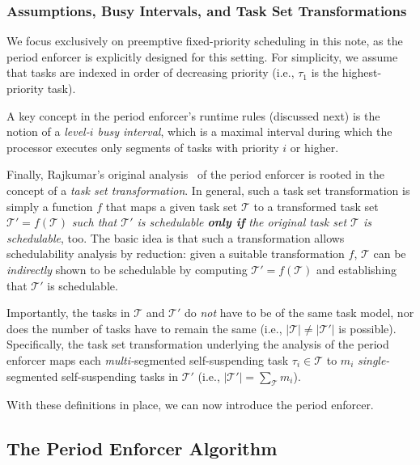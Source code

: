 \subsubsection{Assumptions, Busy Intervals, and Task Set Transformations}
\label{sec:misc-defs}

We focus exclusively on preemptive fixed-priority scheduling in this note, as the period enforcer is explicitly designed for this setting. For simplicity, we assume that tasks are indexed in order of decreasing priority (i.e., $\tau_1$ is the highest-priority task). 

A key concept in the period enforcer's runtime rules (discussed next) is the notion of a \emph{level-$i$ busy interval}, which is a maximal interval during which  the processor executes only segments of tasks with priority $i$ or higher.

\newcommand{\tset}[0]{\mathcal{T}}

Finally, Rajkumar's original analysis~\cite{Raj:suspension1991} of the period enforcer is rooted in the concept of a \emph{task set transformation}. In general, such a task set transformation is simply a function $f$ that maps a given task set $\tset$ to a transformed task set $\tset' = f(\tset)$ \emph{such that $\tset'$ is schedulable \textbf{only if} the original task set $\tset$ is schedulable}, too. The basic idea is that such a transformation allows schedulability analysis by reduction: given a suitable transformation $f$, $\tset$ can be  \emph{indirectly} shown to be schedulable by computing $\tset' = f(\tset)$ and establishing that $\tset'$ is schedulable.



Importantly, the tasks in $\tset$ and $\tset'$ do \emph{not} have to be of the same task model, nor does the number of tasks have to remain the same (i.e.,  $|\tset| \neq |\tset'|$ is possible). Specifically, the task set transformation underlying the analysis of the period enforcer maps each \emph{multi-}segmented self-suspending task $\tau_i \in \tset$  to $m_i$ \emph{single-}segmented self-suspending tasks in $\tset'$ (i.e., $|\tset'| = \sum_{\tset} m_i$).

With these definitions in place, we can now introduce the period enforcer. 



\subsection{The Period Enforcer Algorithm}
\label{sec:pe}

